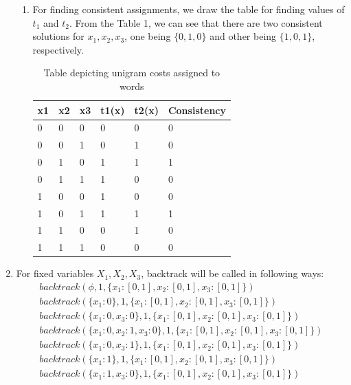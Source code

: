 \documentclass[12pt]{article}
\begin{document}
\begin{enumerate}[label=(\alph*)]
\begin{enumerate}
  \item For finding consistent assignments, we draw the table for finding values of $t_1$ and $t_2$. From the Table 1, we can see that there are two consistent solutions for $x_1, x_2, x_3$, one being $\{0, 1, 0 \}$ and other being $\{ 1, 0, 1\}$, respectively.
  \begin{table}
\centering
\caption{Table depicting unigram costs assigned to words}
\begin{tabular}{|l|l|l|l|l|l|} 
\hline
x1 & x2 & x3 & t1(x) & t2(x) & \textbf{Consistency}  \\ 
\hline
0  & 0  & 0  & 0       & 0       & 0                     \\ 
\hline
0  & 0  & 1  & 0       & 1       & 0                     \\ 
\hline
0  & 1  & 0  & 1       & 1       & 1                     \\ 
\hline
0  & 1  & 1  & 1       & 0       & 0                     \\ 
\hline
1  & 0  & 0  & 1       & 0       & 0                     \\ 
\hline
1  & 0  & 1  & 1       & 1       & 1                     \\ 
\hline
1  & 1  & 0  & 0       & 1       & 0                     \\ 
\hline
1  & 1  & 1  & 0       & 0       & 0                     \\
\hline
\end{tabular}
\end{table}
  \end{enumerate}
  \item For fixed variables $X_1, X_2, X_3$, backtrack will be called in following ways:
  \begin{align*}
  backtrack(\phi, 1, \{x_1: [0, 1], x_2: [0, 1], x_3: [0,1]\}) \\
  backtrack(\{x_1: 0\}, 1, \{x_1: [0, 1], x_2: [0, 1], x_3: [0,1]\}) \\
  backtrack(\{x_1: 0, x_3: 0\}, 1, \{x_1: [0, 1], x_2: [0, 1], x_3: [0,1]\}) \\
  backtrack(\{x_1: 0, x_2: 1, x_3: 0\}, 1, \{x_1: [0, 1], x_2: [0, 1], x_3: [0,1]\}) \\
  backtrack(\{x_1: 0, x_3: 1\}, 1, \{x_1: [0, 1], x_2: [0, 1], x_3: [0,1]\}) \\
  backtrack(\{x_1: 1\}, 1, \{x_1: [0, 1], x_2: [0, 1], x_3: [0,1]\}) \\
  backtrack(\{x_1: 1, x_3: 0\}, 1, \{x_1: [0, 1], x_2: [0, 1], x_3: [0,1]\}) \\

\end{align*}
\end{enumerate}
\end{document}
